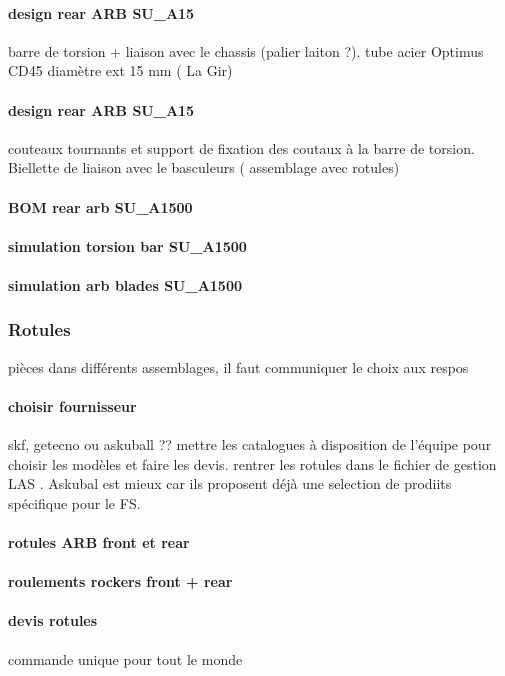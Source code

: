 			\paragraph{design rear ARB SU\_A15} barre de torsion + liaison avec le chassis (palier laiton ?). tube acier Optimus CD45 diamètre ext 15 mm ( La Gir)
			\paragraph{design rear ARB SU\_A15} couteaux tournants et support de fixation des coutaux à la barre de torsion. Biellette de liaison avec le basculeurs ( assemblage avec rotules)
			\paragraph{BOM rear arb SU\_A1500} 
			\paragraph{simulation torsion bar SU\_A1500} 
			\paragraph{simulation arb blades SU\_A1500} 
		\subsubsection*{Rotules} 
 \par pièces dans différents assemblages, il faut communiquer le choix aux respos
			\paragraph{choisir fournisseur} skf, getecno ou askuball ?? mettre les catalogues à disposition de l'équipe pour choisir les modèles et faire les devis. rentrer les rotules dans le fichier de gestion LAS . Askubal est mieux car ils proposent déjà une selection de prodiits spécifique pour le FS. 
			\paragraph{rotules ARB front et rear} 
			\paragraph{roulements rockers front + rear} 
			\paragraph{devis rotules} commande unique pour tout le monde
